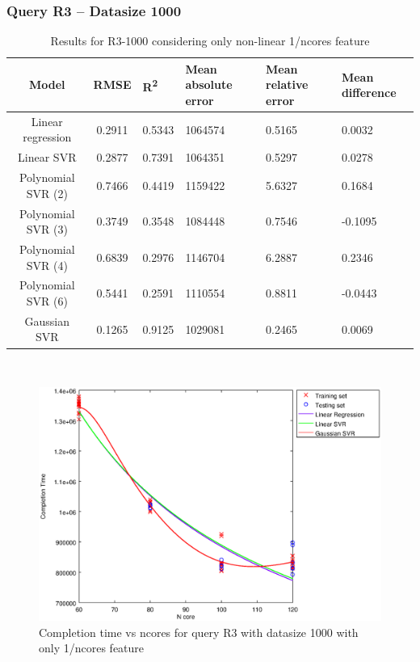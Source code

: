 \documentclass[a4paper,11pt]{article}
\begin{document}
\newpage
\subsubsection{Query R3 -- Datasize 1000}
\begin{table}[H]
	\centering
	\begin{adjustbox}{center}
		\begin{tabular}{c | c M{1.2cm} M{2.5cm} M{2.5cm} M{1.8cm}}
			Model & RMSE & R\textsuperscript{2} & Mean absolute error & Mean relative error & Mean difference \tabularnewline
			\hline
			Linear regression & 0.2911 & 0.5343 & 1064574 & 0.5165 & 0.0032 \\
			Linear SVR & 0.2877 & 0.7391 & 1064351 & 0.5297 & 0.0278 \\
			Polynomial SVR (2) & 0.7466 & 0.4419 & 1159422 & 5.6327 & 0.1684 \\
			Polynomial SVR (3) & 0.3749 & 0.3548 & 1084448 & 0.7546 & -0.1095 \\
			Polynomial SVR (4) & 0.6839 & 0.2976 & 1146704 & 6.2887 & 0.2346 \\
			Polynomial SVR (6) & 0.5441 & 0.2591 & 1110554 & 0.8811 & -0.0443 \\
			Gaussian SVR & 0.1265 & 0.9125 & 1029081 & 0.2465 & 0.0069 \\
		\end{tabular}
	\end{adjustbox}
	\\
	\caption{Results for R3-1000 considering only non-linear 1/ncores feature}
	\label{table_R3_prediction_all}
\end{table}

\begin {figure}[hbtp]
\centering
\includegraphics[width=\textwidth]{output/R3_1000_ONLY_1_OVER_NCORES/plot_R3_1000_bestmodels.eps}
\caption {Completion time vs ncores for query R3 with datasize 1000 with only 1/ncores feature}
\end {figure}
\end{document}
